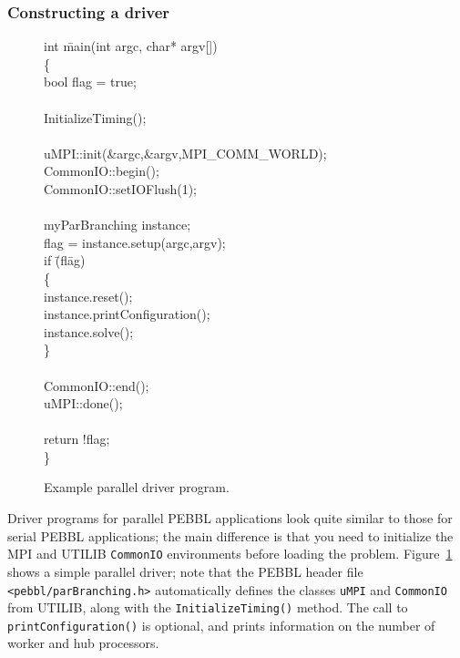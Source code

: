 \subsubsection{Constructing a driver}

\begin{figure}[tbp]
\begin{codeblock}
int \=main(int argc, char* argv[])\\
\{ \\
\>  bool flag = true; \\
\\
\>  InitializeTiming(); \\
 \\
\>  uMPI::init(\&argc,\&argv,MPI\_COMM\_WORLD); \\
\>  CommonIO::begin(); \\
\>  CommonIO::setIOFlush(1); \\
\\
\>  myParBranching instance; \\
\>  flag = instance.setup(argc,argv); \\
\>  if \=(fl\=ag) \\
\>\>	    \{ \\
\>\>\>	      instance.reset(); \\
\>\>\>        instance.printConfiguration(); \\
\>\>\>	      instance.solve(); \\
\>\>	    \} \\
 \\
\>	CommonIO::end(); \\
\>      uMPI::done(); \\
 \\
\>  return !flag; \\
\}
\end{codeblock} 
\caption{Example parallel driver program.}
\label{fig:pardriver}
\end{figure}

Driver programs for parallel PEBBL applications look quite similar to
those for serial PEBBL applications; the main difference is that you
need to initialize the MPI and UTILIB \texttt{CommonIO} environments
before loading the problem. Figure~\ref{fig:pardriver} shows a simple
parallel driver; note that the PEBBL header file
\texttt{<pebbl/parBranching.h>} automatically defines the classes
\texttt{uMPI} and \texttt{CommonIO} from UTILIB, along with the
\texttt{InitializeTiming()} method.  The call to
\texttt{printConfiguration()} is optional, and prints information on
the number of worker and hub processors.

